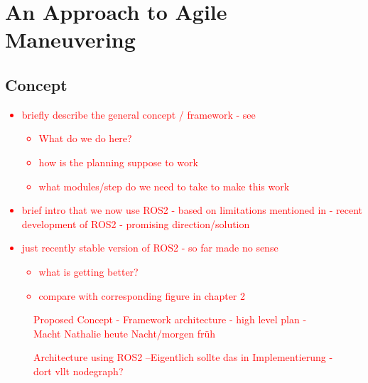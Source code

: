 
\chapter{An Approach to Agile Maneuvering}
\label{chap:approach-to-agile-maneuvering}

\section{Concept}\label{sec:concept}
\textcolor{red}{
\begin{itemize}
    \item briefly describe the general concept / framework - see 
    \begin{itemize}
        \item What do we do here?
        \item how is the planning suppose to work
        \item what modules/step do we need to take to make this work
    \end{itemize} 
    \item brief intro that we now use ROS2 - based on limitations mentioned in  - recent development of ROS2 - promising direction/solution 
    \item just recently stable version of ROS2 - so far made no sense
    \begin{itemize}
        \item what is getting better?
        \item compare with corresponding figure in chapter 2
    \end{itemize}
\end{itemize}}


\begin{figure}
    \centering
    
	\caption{\textcolor{red}{Proposed Concept - Framework architecture - high level plan - Macht Nathalie heute Nacht/morgen früh}}
	\label{fig:overview}
\end{figure}



\begin{figure}[tb]
    \centering
    \caption{\textcolor{red}{Architecture using ROS2 --Eigentlich sollte das in Implementierung - dort vllt nodegraph?}}
    \label{fig:my_label1}
\end{figure}

